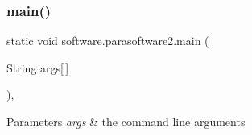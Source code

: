 \subsubsection{\texorpdfstring{main()}{main()}}
{\footnotesize\ttfamily static void software.\+parasoftware2.\+main (\begin{DoxyParamCaption}\item[{String}]{args\mbox{[}$\,$\mbox{]} }\end{DoxyParamCaption})\hspace{0.3cm}{\ttfamily [inline]}, {\ttfamily [static]}}


\begin{DoxyParams}{Parameters}
{\em args} & the command line arguments \\
\hline
\end{DoxyParams}

